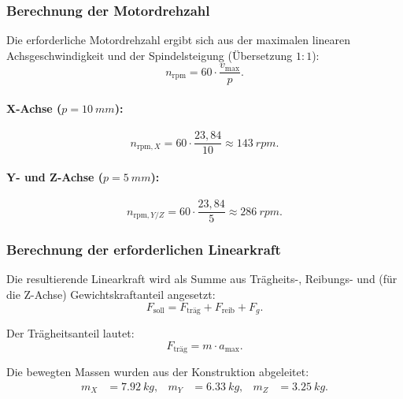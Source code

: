 \subsubsection{Berechnung der Motordrehzahl}

Die erforderliche Motordrehzahl ergibt sich aus der maximalen linearen Achsgeschwindigkeit und der Spindelsteigung
(Übersetzung $1{:}1$):
\begin{equation}
n_\text{rpm}=60\cdot \frac{v_{\max}}{p}.
\end{equation}

\paragraph{X-Achse ($p=\SI{10}{mm}$):}
\begin{equation}
n_{\text{rpm},X}=60\cdot \frac{23,84}{10}\approx \SI{143}{rpm}.
\end{equation}

\paragraph{Y- und Z-Achse ($p=\SI{5}{mm}$):}
\begin{equation}
n_{\text{rpm},Y/Z}=60\cdot \frac{23,84}{5}\approx \SI{286}{rpm}.
\end{equation}

\subsubsection{Berechnung der erforderlichen Linearkraft}

Die resultierende Linearkraft wird als Summe aus Trägheits-, Reibungs- und (für die Z-Achse) Gewichtskraftanteil
angesetzt:
\begin{equation}
F_\text{soll}=F_\text{träg}+F_\text{reib}+F_g.
\end{equation}

Der Trägheitsanteil lautet:
\begin{equation}
F_\text{träg}=m\cdot a_{\max}.
\end{equation}

Die bewegten Massen wurden aus der Konstruktion abgeleitet:
\begin{align}
m_X&=\SI{7,92}{kg},&
m_Y&=\SI{6,33}{kg},&
m_Z&=\SI{3,25}{kg}.
\end{align}

